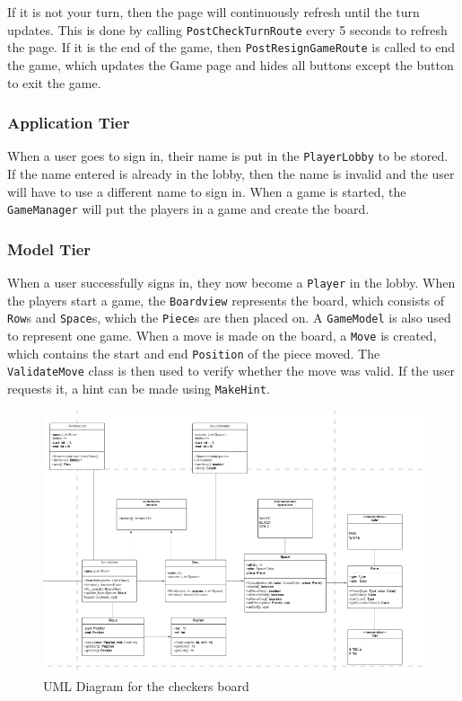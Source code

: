If it is not your turn, then the page will continuously refresh until
the turn updates. This is done by calling \texttt{PostCheckTurnRoute}
every 5 seconds to refresh the page. If it is the end of the game, then
\texttt{PostResignGameRoute} is called to end the game, which updates
the Game page and hides all buttons except the button to exit the game.

\hypertarget{application-tier}{%
\subsubsection{Application Tier}\label{application-tier}}

When a user goes to sign in, their name is put in the
\texttt{PlayerLobby} to be stored. If the name entered is already in the
lobby, then the name is invalid and the user will have to use a
different name to sign in. When a game is started, the
\texttt{GameManager} will put the players in a game and create the
board.

\hypertarget{model-tier}{%
\subsubsection{Model Tier}\label{model-tier}}

When a user successfully signs in, they now become a \texttt{Player} in
the lobby. When the players start a game, the \texttt{Boardview}
represents the board, which consists of \texttt{Row}s and
\texttt{Space}s, which the \texttt{Piece}s are then placed on. A
\texttt{GameModel} is also used to represent one game. When a move is
made on the board, a \texttt{Move} is created, which contains the start
and end \texttt{Position} of the piece moved. The \texttt{ValidateMove}
class is then used to verify whether the move was valid. If the user
requests it, a hint can be made using \texttt{MakeHint}.

\begin{figure}
\centering
\includegraphics{boardUML.png}
\caption{UML Diagram for the checkers board}
\end{figure}

